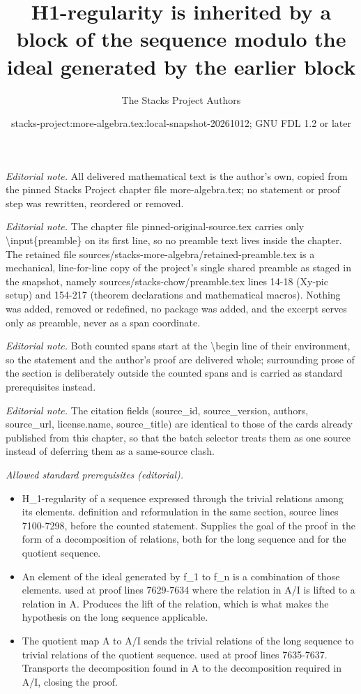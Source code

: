 \documentclass[10pt,a4paper]{amsart}
\title{H1-regularity is inherited by a block of the sequence modulo the ideal generated by the earlier block}
\author{The Stacks Project Authors}
\date{stacks-project:more-algebra.tex:local-snapshot-20261012; GNU FDL 1.2 or later}
\theoremstyle{plain}
\theoremstyle{definition}
\theoremstyle{remark}
\numberwithin{equation}{subsection}
\begin{document}
\maketitle
\setcounter{subsection}{1}
\noindent\textit{Editorial note.} All delivered mathematical text is the author's own, copied from the pinned Stacks Project chapter file more-algebra.tex; no statement or proof step was rewritten, reordered or removed.\par\medskip
\noindent\textit{Editorial note.} The chapter file pinned-original-source.tex carries only \textbackslash{}input\{preamble\} on its first line, so no preamble text lives inside the chapter. The retained file sources/stacks-more-algebra/retained-preamble.tex is a mechanical, line-for-line copy of the project's single shared preamble as staged in the snapshot, namely sources/stacks-chow/preamble.tex lines 14-18 (Xy-pic setup) and 154-217 (theorem declarations and mathematical macros). Nothing was added, removed or redefined, no package was added, and the excerpt serves only as preamble, never as a span coordinate.\par\medskip
\noindent\textit{Editorial note.} Both counted spans start at the \textbackslash{}begin line of their environment, so the statement and the author's proof are delivered whole; surrounding prose of the section is deliberately outside the counted spans and is carried as standard prerequisites instead.\par\medskip
\noindent\textit{Editorial note.} The citation fields (source\_id, source\_version, authors, source\_url, license.name, source\_title) are identical to those of the cards already published from this chapter, so that the batch selector treats them as one source instead of deferring them as a same-source clash.\par\medskip
\noindent\textit{Allowed standard prerequisites (editorial).}\begin{itemize}
\item H\_1-regularity of a sequence expressed through the trivial relations among its elements. definition and reformulation in the same section, source lines 7100-7298, before the counted statement. Supplies the goal of the proof in the form of a decomposition of relations, both for the long sequence and for the quotient sequence.
\item An element of the ideal generated by f\_1 to f\_n is a combination of those elements. used at proof lines 7629-7634 where the relation in A/I is lifted to a relation in A. Produces the lift of the relation, which is what makes the hypothesis on the long sequence applicable.
\item The quotient map A to A/I sends the trivial relations of the long sequence to trivial relations of the quotient sequence. used at proof lines 7635-7637. Transports the decomposition found in A to the decomposition required in A/I, closing the proof.
\end{itemize}\medskip
\end{document}

